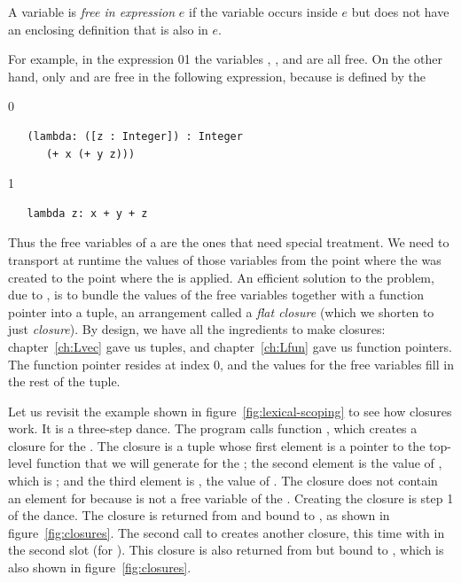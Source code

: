 \documentclass[7x10]{TimesAPriori_MIT}%
\def\racketEd{0}
\def\pythonEd{1}
\def\edition{1}
\newcommand{\racket}[1]{{\if\edition\racketEd{#1}\fi}}
\newcommand{\pythonColor}[0]{}
\newcommand{\python}[1]{{\if\edition\pythonEd\pythonColor #1\fi}}
\numberwithin{theorem}{chapter}
\numberwithin{definition}{chapter}
\numberwithin{equation}{chapter}
\begin{document}
\begin{definition}\normalfont
A variable is \emph{free in expression} $e$ if the variable occurs
inside $e$ but does not have an enclosing definition that is also in
$e$.
\end{definition}

For example, in the expression
\racket{}\python{}
the variables , , and  are all free.  On the other hand,
only  and  are free in the following expression,
because  is defined by the 
{\if\edition\racketEd
\begin{lstlisting}
   (lambda: ([z : Integer]) : Integer
      (+ x (+ y z)))
\end{lstlisting}
\fi}
{\if\edition\pythonEd\pythonColor
\begin{lstlisting}
   lambda z: x + y + z
\end{lstlisting}
\fi}
%
\noindent Thus the free variables of a  are the ones that
need special treatment. We need to transport at runtime the values
of those variables from the point where the  was created
to the point where the  is applied. An efficient solution
to the problem, due to \citet{Cardelli:1983aa}, is to bundle the
values of the free variables together with a function pointer into a
tuple, an arrangement called a \emph{flat closure} (which we shorten
to just \emph{closure}).
%
By design, we have all the ingredients to make closures:
chapter~\ref{ch:Lvec} gave us tuples, and chapter~\ref{ch:Lfun} gave us
function pointers. The function pointer resides at index $0$, and the
values for the free variables fill in the rest of the tuple.

Let us revisit the example shown in figure~\ref{fig:lexical-scoping}
to see how closures work. It is a three-step dance. The program calls
function , which creates a closure for the . The
closure is a tuple whose first element is a pointer to the top-level
function that we will generate for the ; the second
element is the value of , which is ; and the third
element is , the value of . The closure does not
contain an element for  because  is not a free
variable of the . Creating the closure is step 1 of the
dance. The closure is returned from  and bound to , as
shown in figure~\ref{fig:closures}.
%
The second call to  creates another closure, this time with
 in the second slot (for ). This closure is also
returned from  but bound to , which is also shown in
figure~\ref{fig:closures}.
\end{document}
